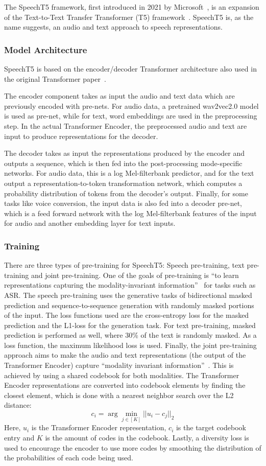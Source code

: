 The SpeechT5 framework, first introduced in 2021 by Microsoft~\cite{speecht5}, is an expansion of the Text-to-Text Transfer Transformer (T5) framework~\cite{t5}. SpeechT5 is, as the name suggests, an audio and text approach to speech representations. 
\subsubsection{Model Architecture}
SpeechT5 is based on the encoder/decoder Transformer architecture also used in the original Transformer paper~\cite{vaswani2023attention}.

The encoder component takes as input the audio and text data which are previously encoded with pre-nets. For audio data, a pretrained wav2vec2.0 model is used as pre-net, while for text, word embeddings are used in the preprocessing step. In the actual Transformer Encoder, the preprocessed audio and text are input to produce representations for the decoder.

The decoder takes as input the representations produced by the encoder and outputs a sequence, which is then fed into the post-processing mode-specific networks. For audio data, this is a log Mel-filterbank predictor, and for the text output a representation-to-token transformation network, which computes a probability distribution of tokens from the decoder's output. Finally, for some tasks like voice conversion, the input data is also fed into a decoder pre-net, which is a feed forward network with the log Mel-filterbank features of the input for audio and another embedding layer for text inputs.
\subsubsection{Training}
There are three types of pre-training for SpeechT5: Speech pre-training, text pre-training and joint pre-training. One of the goals of pre-training is ``to learn representations
capturing the modality-invariant information''~\cite{speecht5} for tasks such as ASR. The speech pre-training uses the generative tasks of bidirectional masked prediction and sequence-to-sequence generation with randomly masked portions of the input. The loss functions used are the cross-entropy loss for the masked prediction and the L1-loss for the generation task. For text pre-training, masked prediction is performed as well, where 30\% of the text is randomly masked. As a loss function, the maximum likelihood loss is used. Finally, the joint pre-training approach aims to make the audio and text representations (the output of the Transformer Encoder) capture ``modality invariant information''~\cite{speecht5}. This is achieved by using a shared codebook for both modalities. The Transformer Encoder representations are converted into codebook elements by finding the closest element, which is done with a nearest neighbor search over the L2 distance: $$c_i = \arg\mathop{\min}\limits_{j\in [K]} ||u_i-c_j||_2$$ Here, $u_i$ is the Transformer Encoder representation, $c_i$ is the target codebook entry and $K$ is the amount of codes in the codebook. Lastly, a diversity loss is used to encourage the encoder to use more codes by smoothing the distribution of the probabilities of each code being used.

